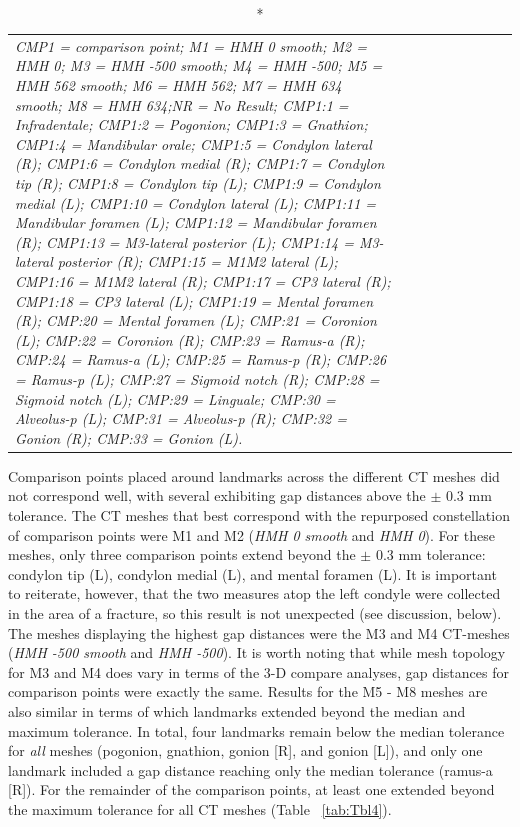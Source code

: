 \documentclass[review]{elsarticle}
\begin{document}
\begin{center}
\begin{longtable}{lrrrrrrrr}
\caption*{\textit{CMP1 = comparison point; M1 = HMH 0 smooth; M2 = HMH 0; M3 = HMH -500 smooth; M4 = HMH -500; M5 = HMH 562 smooth; M6 = HMH 562; M7 = HMH 634 smooth; M8 = HMH 634;NR = No Result; CMP1:1 = Infradentale; CMP1:2 = Pogonion; CMP1:3 = Gnathion; CMP1:4 = Mandibular orale; CMP1:5 = Condylon lateral (R); CMP1:6 = Condylon medial (R); CMP1:7 = Condylon tip (R); CMP1:8 = Condylon tip (L); CMP1:9 = Condylon medial (L); CMP1:10 = Condylon lateral (L); CMP1:11 = Mandibular foramen (L); CMP1:12 = Mandibular foramen (R); CMP1:13 = M3-lateral posterior (L); CMP1:14 = M3-lateral posterior (R); CMP1:15 = M1M2 lateral (L); CMP1:16 = M1M2 lateral (R); CMP1:17 = CP3 lateral (R); CMP1:18 = CP3 lateral (L); CMP1:19 = Mental foramen (R); CMP:20 = Mental foramen (L); CMP:21 = Coronion (L); CMP:22 = Coronion (R); CMP:23 = Ramus-a (R); CMP:24 = Ramus-a (L); CMP:25 = Ramus-p (R); CMP:26 = Ramus-p (L); CMP:27 = Sigmoid notch (R); CMP:28 = Sigmoid notch (L); CMP:29 = Linguale; CMP:30 = Alveolus-p (L); CMP:31 = Alveolus-p (R); CMP:32 = Gonion (R); CMP:33 = Gonion (L).}}
\end{longtable}
\end{center}

Comparison points placed around landmarks across the different CT meshes did not correspond well, with several exhibiting gap distances above the $\pm$ 0.3 mm tolerance. The CT meshes that best correspond with the repurposed constellation of comparison points were M1 and M2 (\textit{HMH 0 smooth} and \textit{HMH 0}). For these meshes, only three comparison points extend beyond the $\pm$ 0.3 mm tolerance: condylon tip (L), condylon medial (L), and mental foramen (L). It is important to reiterate, however, that the two measures atop the left condyle were collected in the area of a fracture, so this result is not unexpected (see discussion, below). The meshes displaying the highest gap distances were the M3 and M4 CT-meshes (\textit{HMH -500 smooth} and \textit{HMH -500}). It is worth noting that while mesh topology for M3 and M4 does vary in terms of the 3-D compare analyses, gap distances for comparison points were exactly the same. Results for the M5 - M8 meshes are also similar in terms of which landmarks extended beyond the median and maximum tolerance. In total, four landmarks remain below the median tolerance for \textit{all} meshes (pogonion, gnathion, gonion [R], and gonion [L]), and only one landmark included a gap distance reaching only the median tolerance (ramus-a [R]). For the remainder of the comparison points, at least one extended beyond the maximum tolerance for all CT meshes (Table ~\ref{tab:Tbl4}). 
\end{document}
